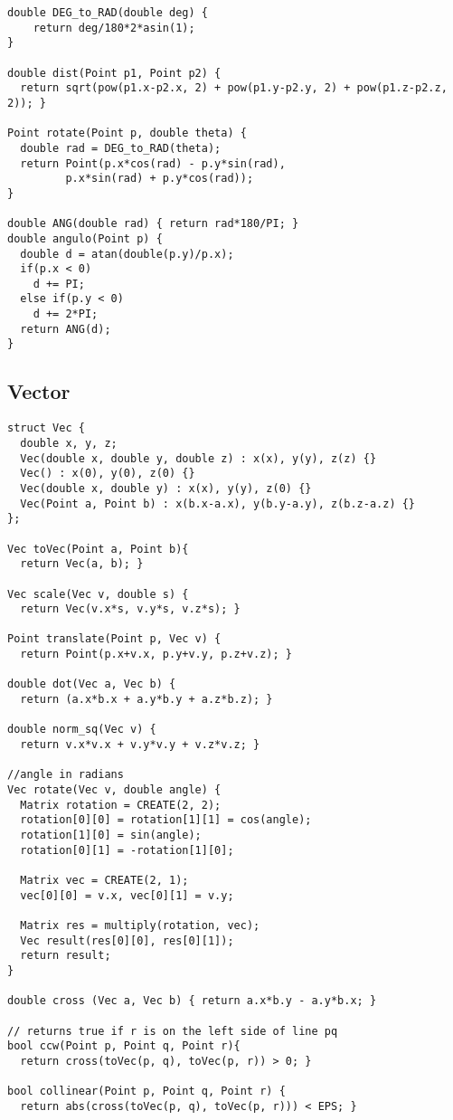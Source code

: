 \documentclass[8pt, oneside]{extarticle}
\begin{document}
\begin{multicols}{3}
\begin{lstlisting}
double DEG_to_RAD(double deg) {
    return deg/180*2*asin(1);
}

double dist(Point p1, Point p2) {
  return sqrt(pow(p1.x-p2.x, 2) + pow(p1.y-p2.y, 2) + pow(p1.z-p2.z, 2)); }
  
Point rotate(Point p, double theta) {
  double rad = DEG_to_RAD(theta);
  return Point(p.x*cos(rad) - p.y*sin(rad),
         p.x*sin(rad) + p.y*cos(rad));
}

double ANG(double rad) { return rad*180/PI; }
double angulo(Point p) {
  double d = atan(double(p.y)/p.x);
  if(p.x < 0)
    d += PI;
  else if(p.y < 0)
    d += 2*PI;
  return ANG(d);
}
\end{lstlisting}

\subsection{Vector}
\begin{lstlisting}
struct Vec {
  double x, y, z;
  Vec(double x, double y, double z) : x(x), y(y), z(z) {}
  Vec() : x(0), y(0), z(0) {}
  Vec(double x, double y) : x(x), y(y), z(0) {}
  Vec(Point a, Point b) : x(b.x-a.x), y(b.y-a.y), z(b.z-a.z) {}
};

Vec toVec(Point a, Point b){
  return Vec(a, b); }

Vec scale(Vec v, double s) {
  return Vec(v.x*s, v.y*s, v.z*s); }

Point translate(Point p, Vec v) {
  return Point(p.x+v.x, p.y+v.y, p.z+v.z); }

double dot(Vec a, Vec b) {
  return (a.x*b.x + a.y*b.y + a.z*b.z); }

double norm_sq(Vec v) {
  return v.x*v.x + v.y*v.y + v.z*v.z; }

//angle in radians
Vec rotate(Vec v, double angle) {
  Matrix rotation = CREATE(2, 2);
  rotation[0][0] = rotation[1][1] = cos(angle);
  rotation[1][0] = sin(angle);
  rotation[0][1] = -rotation[1][0];

  Matrix vec = CREATE(2, 1);
  vec[0][0] = v.x, vec[0][1] = v.y;

  Matrix res = multiply(rotation, vec);
  Vec result(res[0][0], res[0][1]);
  return result;
}

double cross (Vec a, Vec b) { return a.x*b.y - a.y*b.x; }

// returns true if r is on the left side of line pq
bool ccw(Point p, Point q, Point r){
  return cross(toVec(p, q), toVec(p, r)) > 0; }

bool collinear(Point p, Point q, Point r) {
  return abs(cross(toVec(p, q), toVec(p, r))) < EPS; }


\end{lstlisting}
\end{multicols}
\end{document}

